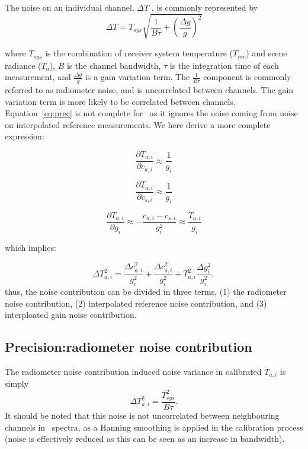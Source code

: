 
The noise on an individual channel, \(\Delta T\) , is commonly represented by
\begin{equation}
\Delta T = T_{sys}\sqrt{ \frac{1}{B\tau} + \left( \frac{\Delta g}{g} \right)^2 }
\label{eq:prec}
\end{equation}

where \(T_{sys}\) is the combination of receiver system temperature (\(T_{rec}\)) and
scene radiance (\(T_{a}\)), \(B\) is the channel bandwidth,
\(\tau\) is the integration time of each measurement, and \(\frac{\Delta g}{g}\)
is a gain variation term. The \(\frac{1}{B\tau}\) component is commonly referred to as
radiometer noise, and is uncorrelated between channels.
The gain variation term is more likely to be correlated between channels.
Equation~\ref{eq:prec} is not complete for \smr\ as it ignores the noise
coming from noise on interpolated reference measurements.
We here derive a more complete expression:

\begin{equation}
\frac{\partial T_{a,i}}{\partial c_{a,i}} \approx \frac{1}{g_i} 
\end{equation}

\begin{equation}
\frac{\partial T_{a,i}}{\partial c_{s,i}} \approx \frac{1}{g_i} 
\end{equation}

\begin{equation}
\frac{\partial T_{a,i}}{\partial g_{i}} \approx -\frac{c_{a,i}-c_{s,i}}{g_{i}^{2}} \approx \frac{T_{a,i}}{g_i} 
\end{equation}

which implies:

\begin{equation}
\Delta T_{a,i}^{2} = \frac{\Delta c_{a,i}^{2}}{g_{i}^2} + \frac{\Delta c_{s,i}^{2}}{g_{i}^2} + T_{a,i}^{2}\frac{\Delta g_{i}^{2}}{g_{i}^2},
\end{equation}
thus, the noise contribution can be divided in three terms, (1) the radiometer noise contribution,
(2) interpolated reference noise contribution, and (3) interploated gain noise contribution.  

\subsection*{Precision:radiometer noise contribution}
The radiometer noise contribution induced noise variance in calibrated \(T_{a,i}\) is simply
\begin{equation}
\Delta T_{a,i}^2 = \frac{T_{sys}^{2}}{B\tau}.
\end{equation}
It should be noted that this noise is not uncorrelated between neighbouring channels
in \smr\ spectra, as a Hanning smoothing is applied in the calibration process
(noise is effectively reduced as this can be seen as an increase in bandwidth).    


